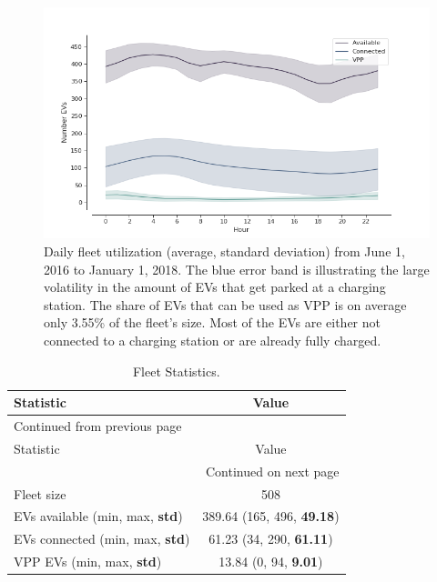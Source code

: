 \documentclass[a4paper, 12pt]{article}
\begin{document}
\begin{figure}[h]
\centering
\includegraphics[width=1\linewidth]{./fig/fleet-utilization.png}
\caption[Fleet Utilzation]{Daily fleet utilization (average, standard deviation) from June 1, 2016 to January 1, 2018. The blue error band is illustrating the large volatility in the amount of EVs that get parked at a charging station. The share of EVs that can be used as VPP is on average only 3.55\% of the fleet's size. Most of the EVs are either not connected to a charging station or are already fully charged.}
\end{figure}

\begin{longtable}{l|c}
\caption[Fleet Statistics]{Fleet Statistics. \label{table-sim-stats}}
\\
\hline
\hline
Statistic & Value\\
\hline
\endfirsthead
\multicolumn{2}{l}{Continued from previous page} \\
\hline

Statistic & Value \\

\hline
\endhead
\hline\multicolumn{2}{r}{Continued on next page} \\
\endfoot
\endlastfoot
\hline
Fleet size & 508\\
EVs available (min, max, \textbf{std}) & 389.64 (165, 496, \textbf{49.18})\\
EVs connected (min, max, \textbf{std}) & 61.23 (34, 290, \textbf{61.11})\\
VPP EVs (min, max, \textbf{std}) & 13.84 (0, 94, \textbf{9.01})\\
\hline
\hline
\end{longtable}
\end{document}
